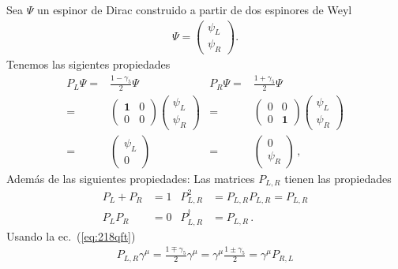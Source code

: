 \begin{frame}
Sea $\Psi$ un espinor de Dirac construido a partir de dos espinores de Weyl
\begin{align}
  \Psi=
  \begin{pmatrix}
   \psi_L\\
    \psi_R
  \end{pmatrix}.
\end{align}
Tenemos las sigientes propiedades
\begin{align}
   P_L \Psi=& \frac{1-\gamma_5}{2}\Psi & P_R \Psi=& \frac{1+\gamma_5}{2}\Psi \nonumber\\
   =&
   \begin{pmatrix}
    \mathbf{1} & 0 \\
     0 & 0
   \end{pmatrix} \begin{pmatrix}
   \psi_L\\
    \psi_R
  \end{pmatrix} & =&\begin{pmatrix}
    0 & 0 \\
     0 & \mathbf{1}
   \end{pmatrix} \begin{pmatrix}
   \psi_L\\
    \psi_R
  \end{pmatrix}\nonumber\\
  =& \begin{pmatrix}
   \psi_L\\
    0
  \end{pmatrix} & =& \begin{pmatrix}
   0\\
    \psi_R
  \end{pmatrix}\,,
\end{align}
Además de las siguientes propiedades:
Las matrices $P_{L,R}$ tienen las propiedades
\begin{align}
  P_L+P_R&=1 & P_{L,R}^2&=P_{L,R}P_{L,R}=P_{L,R}\nonumber\\
  P_L P_R&=0& P_{L,R}^\dagger&=P_{L,R}\,.
\end{align}
Usando la ec.~(\ref{eq:218qft})
\begin{align}
  P_{L,R}\gamma^\mu=\frac{1\mp\gamma_5}{2}\gamma^\mu=\gamma^\mu\frac{1\pm\gamma_5}{2}=\gamma^\mu P_{R,L}
\end{align}


\end{frame}

